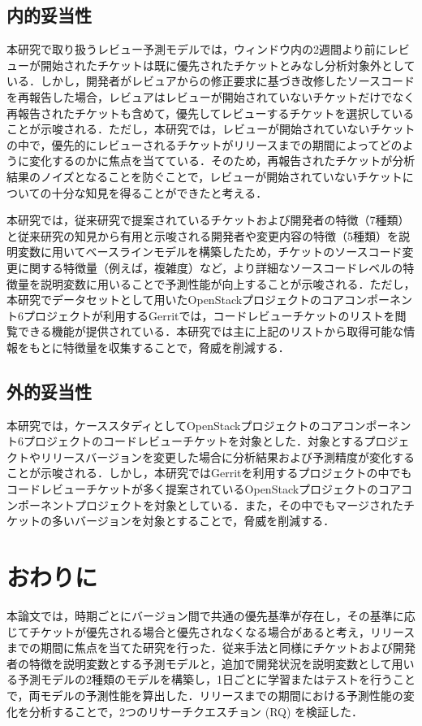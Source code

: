 \documentclass[submit]{ipsj}
\begin{document}
\subsection{内的妥当性}
本研究で取り扱うレビュー予測モデルでは，ウィンドウ内の2週間より前にレビューが開始されたチケットは既に優先されたチケットとみなし分析対象外としている．しかし，開発者がレビュアからの修正要求に基づき改修したソースコードを再報告した場合，レビュアはレビューが開始されていないチケットだけでなく再報告されたチケットも含めて，優先してレビューするチケットを選択していることが示唆される．ただし，本研究では，レビューが開始されていないチケットの中で，優先的にレビューされるチケットがリリースまでの期間によってどのように変化するのかに焦点を当てている．そのため，再報告されたチケットが分析結果のノイズとなることを防ぐことで，レビューが開始されていないチケットについての十分な知見を得ることができたと考える．

本研究では，従来研究\cite{prioritizer}で提案されているチケットおよび開発者の特徴（7種類）と従来研究\cite{release_merge}\cite{review1}の知見から有用と示唆される開発者や変更内容の特徴（5種類）を説明変数に用いてベースラインモデルを構築したため，チケットのソースコード変更に関する特徴量（例えば，複雑度）など，より詳細なソースコードレベルの特徴量を説明変数に用いることで予測性能が向上することが示唆される．ただし，本研究でデータセットとして用いたOpenStackプロジェクトのコアコンポーネント6プロジェクトが利用するGerritでは，コードレビューチケットのリストを閲覧できる機能が提供されている．本研究では主に上記のリストから取得可能な情報をもとに特徴量を収集することで，脅威を削減する．

\subsection{外的妥当性}
本研究では，ケーススタディとしてOpenStackプロジェクトのコアコンポーネント6プロジェクトのコードレビューチケットを対象とした．対象とするプロジェクトやリリースバージョンを変更した場合に分析結果および予測精度が変化することが示唆される．しかし，本研究ではGerritを利用するプロジェクトの中でもコードレビューチケットが多く提案されているOpenStackプロジェクトのコアコンポーネントプロジェクトを対象としている．また，その中でもマージされたチケットの多いバージョンを対象とすることで，脅威を削減する．


\section{おわりに}\label{sec:fig-tab-exp}
本論文では，時期ごとにバージョン間で共通の優先基準が存在し，その基準に応じてチケットが優先される場合と優先されなくなる場合があると考え，リリースまでの期間に焦点を当てた研究を行った．従来手法と同様にチケットおよび開発者の特徴を説明変数とする予測モデルと，追加で開発状況を説明変数として用いる予測モデルの2種類のモデルを構築し，1日ごとに学習またはテストを行うことで，両モデルの予測性能を算出した．リリースまでの期間における予測性能の変化を分析することで，2つのリサーチクエスチョン (RQ) を検証した．
\end{document}
